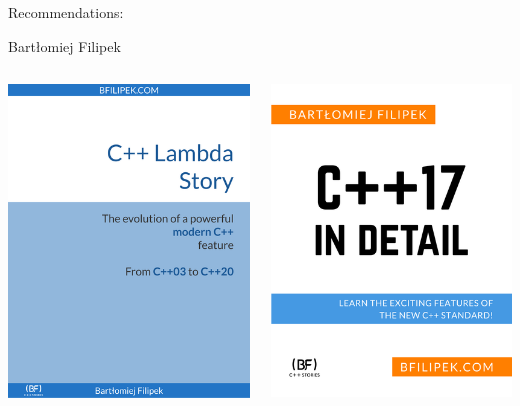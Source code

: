 \documentclass[10pt]{beamer}
\begin{document}
\begin{frame}{Recommendations:}
	\centerline{Bartłomiej Filipek}
	\vfill
	\begin{columns}
		\begin{column}{0.48\linewidth}
			\includegraphics[width=0.9\linewidth]{lambda.png}
		\end{column} \pause
		\begin{column}{0.48\linewidth}
			\includegraphics[width=0.9\linewidth]{Cpp17.png}

\end{column}
\end{columns}
\end{frame}
\end{document}
